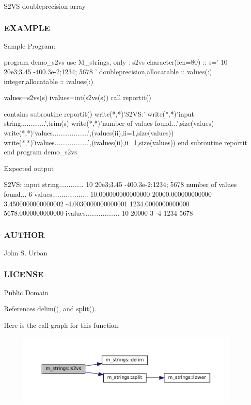 S2\+VS doubleprecision array

\subsubsection*{E\+X\+A\+M\+P\+LE}

Sample Program\+: \begin{DoxyVerb} program demo_s2vs
 use M_strings, only : s2vs
 character(len=80)           :: s=' 10 20e3;3.45 -400.3e-2;1234; 5678 '
 doubleprecision,allocatable :: values(:)
 integer,allocatable         :: ivalues(:)

 values=s2vs(s)
 ivalues=int(s2vs(s))
 call reportit()

 contains
   subroutine reportit()
     write(*,*)'S2VS:'
     write(*,*)'input string.............',trim(s)
     write(*,*)'number of values found...',size(values)
     write(*,*)'values...................',(values(ii),ii=1,size(values))
     write(*,*)'ivalues..................',(ivalues(ii),ii=1,size(values))
   end subroutine reportit
 end program demo_s2vs
\end{DoxyVerb}


Expected output \begin{DoxyVerb}S2VS:
input string............. 10 20e3;3.45 -400.3e-2;1234; 5678
number of values found... 6
values................... 10.000000000000000  20000.000000000000 3.4500000000000002
-4.0030000000000001       1234.0000000000000  5678.0000000000000
ivalues.................. 10  20000  3  -4 1234 5678
\end{DoxyVerb}
 \subsubsection*{A\+U\+T\+H\+OR}

John S. Urban \subsubsection*{L\+I\+C\+E\+N\+SE}

Public Domain 

References delim(), and split().

Here is the call graph for this function\+:
\nopagebreak
\begin{figure}[H]
\begin{center}
\leavevmode
\includegraphics[width=350pt]{namespacem__strings_ad7fffe79559a666aa28e1ed598b8670f_cgraph}
\end{center}
\end{figure}
\mbox{\label{namespacem__strings_a536b90500130aa47bde4def7ecd5f6aa}} 

